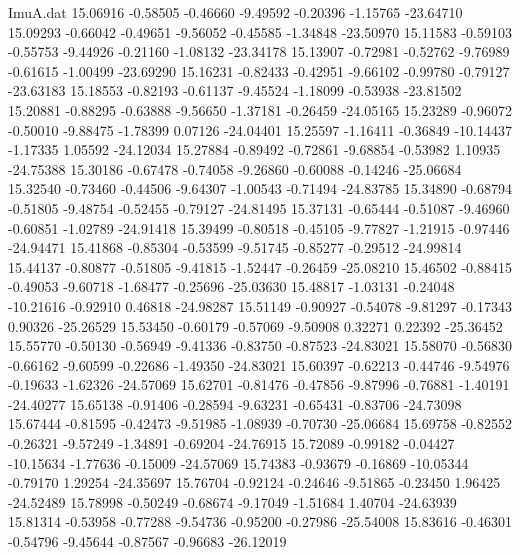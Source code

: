 \begin{filecontents}{ImuA.dat}
  15.06916   -0.58505   -0.46660   -9.49592   -0.20396   -1.15765  -23.64710
  15.09293   -0.66042   -0.49651   -9.56052   -0.45585   -1.34848  -23.50970
  15.11583   -0.59103   -0.55753   -9.44926   -0.21160   -1.08132  -23.34178
  15.13907   -0.72981   -0.52762   -9.76989   -0.61615   -1.00499  -23.69290
  15.16231   -0.82433   -0.42951   -9.66102   -0.99780   -0.79127  -23.63183
  15.18553   -0.82193   -0.61137   -9.45524   -1.18099   -0.53938  -23.81502
  15.20881   -0.88295   -0.63888   -9.56650   -1.37181   -0.26459  -24.05165
  15.23289   -0.96072   -0.50010   -9.88475   -1.78399    0.07126  -24.04401
  15.25597   -1.16411   -0.36849  -10.14437   -1.17335    1.05592  -24.12034
  15.27884   -0.89492   -0.72861   -9.68854   -0.53982    1.10935  -24.75388
  15.30186   -0.67478   -0.74058   -9.26860   -0.60088   -0.14246  -25.06684
  15.32540   -0.73460   -0.44506   -9.64307   -1.00543   -0.71494  -24.83785
  15.34890   -0.68794   -0.51805   -9.48754   -0.52455   -0.79127  -24.81495
  15.37131   -0.65444   -0.51087   -9.46960   -0.60851   -1.02789  -24.91418
  15.39499   -0.80518   -0.45105   -9.77827   -1.21915   -0.97446  -24.94471
  15.41868   -0.85304   -0.53599   -9.51745   -0.85277   -0.29512  -24.99814
  15.44137   -0.80877   -0.51805   -9.41815   -1.52447   -0.26459  -25.08210
  15.46502   -0.88415   -0.49053   -9.60718   -1.68477   -0.25696  -25.03630
  15.48817   -1.03131   -0.24048  -10.21616   -0.92910    0.46818  -24.98287
  15.51149   -0.90927   -0.54078   -9.81297   -0.17343    0.90326  -25.26529
  15.53450   -0.60179   -0.57069   -9.50908    0.32271    0.22392  -25.36452
  15.55770   -0.50130   -0.56949   -9.41336   -0.83750   -0.87523  -24.83021
  15.58070   -0.56830   -0.66162   -9.60599   -0.22686   -1.49350  -24.83021
  15.60397   -0.62213   -0.44746   -9.54976   -0.19633   -1.62326  -24.57069
  15.62701   -0.81476   -0.47856   -9.87996   -0.76881   -1.40191  -24.40277
  15.65138   -0.91406   -0.28594   -9.63231   -0.65431   -0.83706  -24.73098
  15.67444   -0.81595   -0.42473   -9.51985   -1.08939   -0.70730  -25.06684
  15.69758   -0.82552   -0.26321   -9.57249   -1.34891   -0.69204  -24.76915
  15.72089   -0.99182   -0.04427  -10.15634   -1.77636   -0.15009  -24.57069
  15.74383   -0.93679   -0.16869  -10.05344   -0.79170    1.29254  -24.35697
  15.76704   -0.92124   -0.24646   -9.51865   -0.23450    1.96425  -24.52489
  15.78998   -0.50249   -0.68674   -9.17049   -1.51684    1.40704  -24.63939
  15.81314   -0.53958   -0.77288   -9.54736   -0.95200   -0.27986  -25.54008
  15.83616   -0.46301   -0.54796   -9.45644   -0.87567   -0.96683  -26.12019

\end{filecontents}
